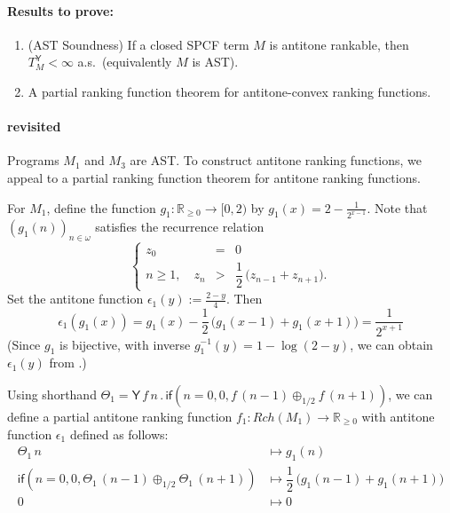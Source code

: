 \documentclass{article}
\newcommand{\Real}{\mathbb{R}}
\newcommand{\nnReal}{\mathbb{R}_{{\geq}0}}
\newcommand{\tY}{\mathsf{Y}}
\newcommand{\tif}[3]{\mathsf{if}(#1, #2, #3)} %
\theoremstyle{definition}
\theoremstyle{lemma}
\theoremstyle{remark}
\begin{document}
\paragraph{Results to prove:}
\begin{enumerate}
\item (AST Soundness) If a closed SPCF term $M$ is antitone rankable, then $T^{\tY}_M < \infty$ a.s.~(equivalently $M$ is AST). 

\item A partial ranking function theorem for antitone-convex ranking functions. 
\end{enumerate}

\paragraph{ revisited}

Programs $M_1$ and $M_3$ are AST.
To construct antitone ranking functions, we appeal  to a partial ranking function theorem for antitone ranking functions.

For $M_1$, define the function $g_1 : \nnReal \to [0, 2)$ by $g_1(x) = 2 - \frac{1}{2^{x-1}}$.
Note that $(g_1 (n))_{n \in \omega}$ satisfies the recurrence relation
\[
\left\{
\begin{array}{rll}
z_0 &=& 0\\
n \geq 1, \quad z_n &>& \dfrac{1}{2} \, \big( z_{n-1} + z_{n+1}\big).
\end{array}
\right.
\]
Set the antitone function $\epsilon_1 (y) :=  \frac{2-y}{4}$.
Then
\begin{equation}
\epsilon_1(g_1(x)) = g_1(x) - \dfrac{1}{2} \, \big(g_1(x-1) + g_1(x+1)\big) = \dfrac{1}{2^{x+1}}
\label{eqn:epsilon g M1}
\end{equation}
(Since $g_1$ is bijective, with inverse $g_1^{-1}(y) = 1 - \log (2-y)$, we can obtain $\epsilon_1(y)$ from .) 

Using shorthand 
$\Theta_1 = \tY \, f \, n \, . \, 
\tif{n = 0}{0}{f \, (n - 1) \oplus_{1/2} f \, (n + 1)}$, 
we can define a partial antitone ranking function $f_1 : \mathit{Rch}(M_1) \to \nnReal$ with antitone function $\epsilon_1$ defined as follows:
\begin{align*}
{\Theta_1} \, n 
&\mapsto 
g_1(n)
\\
\tif{n = 0}{0}{\Theta_1 \, (n - 1) \oplus_{1/2} \Theta_1 \, (n + 1)}
&\mapsto
\dfrac{1}{2} \, \big(g_1(n-1) + g_1(n+1)\big)
\\
0 &\mapsto 0
\end{align*}
\end{document}
